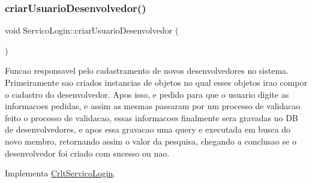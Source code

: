 \mbox{\label{class_servico_login_aff5fc69ce9c3fa82c6c575f025ac2a34}} 
\subsubsection{\texorpdfstring{criar\+Usuario\+Desenvolvedor()}{criarUsuarioDesenvolvedor()}}
{\footnotesize\ttfamily void Servico\+Login\+::criar\+Usuario\+Desenvolvedor (\begin{DoxyParamCaption}{ }\end{DoxyParamCaption})\hspace{0.3cm}{\ttfamily [virtual]}}

Funcao responsavel pelo cadastramento de novos desenvolvedores no sistema. Primeiramente sao criados instancias de objetos no qual esses objetos irao compor o cadastro do desenvolvedor. Apos isso, e pedido para que o usuario digite as informacoes pedidas, e assim as mesmas passaram por um processo de validacao feito o processo de validacao, essas informacoes finalmente sera gravadas no DB de desenvolvedores, e apos essa gravacao uma query e executada em busca do novo membro, retornando assim o valor da pesquisa, chegando a conclusao se o desenvolvedor foi criado com sucesso ou nao.

Implementa \mbox{\hyperlink{class_crlt_servico_login_aab452ac1f3d0fd6d2f6989017026b188}{Crlt\+Servico\+Login}}.


